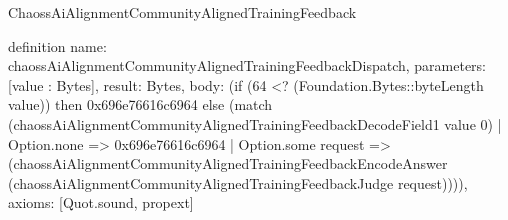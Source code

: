 \begin{lexlean}{ChaossAiAlignmentCommunityAlignedTrainingFeedback}
\begin{semanticmodule}
definition{
  name: chaossAiAlignmentCommunityAlignedTrainingFeedbackDispatch,
  parameters: [value : Bytes],
  result: Bytes,
  body: (if (64 <? (Foundation.Bytes::byteLength value)) then 0x696e76616c6964 else (match (chaossAiAlignmentCommunityAlignedTrainingFeedbackDecodeField1 value 0)
    | Option.none => 0x696e76616c6964
    | Option.some request => (chaossAiAlignmentCommunityAlignedTrainingFeedbackEncodeAnswer (chaossAiAlignmentCommunityAlignedTrainingFeedbackJudge request)))),
  axioms: [Quot.sound, propext]
}
\end{semanticmodule}
\end{lexlean}
